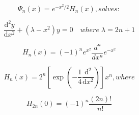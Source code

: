 \[\begin{equation} \label{weberherm(i)} \Psi_n(x) = e^{-x^2/2}H_n(x), solves: \end{equation}\]

\[\begin{equation} \label{weberherm(ii)} \frac{\mathrm{d}^2y}{\mathrm{d}x^2} + (\lambda - x^2)y = 0\quad where\; \lambda = 2n+1 \end{equation}\]

\[\begin{equation} \label{thrm5.2} H_{n}(x)=(-1)^{n}e^{x^{2}}{\frac {d^{n}}{dx^{n}}}e^{-x^{2}} \end{equation}\]

\[\begin{equation} \label{thrm5.3(i)} H_n(x) = 2^n[\exp{(-\frac{1}{4}\frac{\mathrm{d}^2}{\mathrm{d}x^2})}]x^n, where \end{equation}\]

\[\begin{equation} \label{thrm5.4(i)} H_{2n}(0) = (-1)^n\frac{(2n)!}{n!} \end{equation}\]

